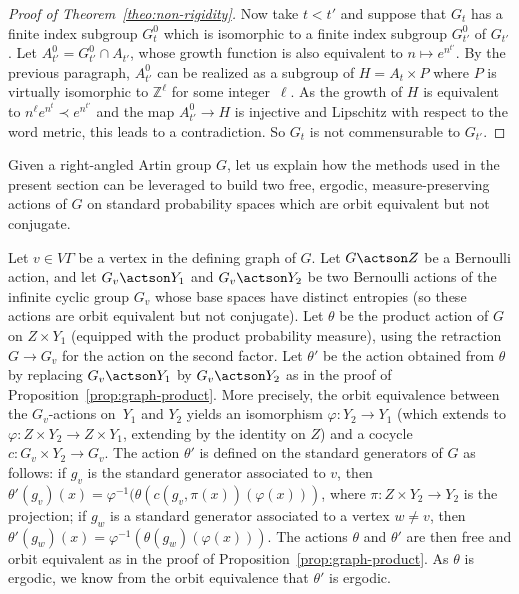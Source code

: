 \begin{proof}[Proof of Theorem~\ref{theo:non-rigidity}]
Now take $t<t'$ and suppose that $G_{t}$ has a finite index subgroup $G^0_t$ which is isomorphic to a finite index subgroup $G^0_{t'}$ of $G_{t'}$. Let $A^0_{t'}=G^0_{t'}\cap A_{t'}$, whose growth function is also equivalent to $n\mapsto e^{n^{t'}}$. By the previous paragraph, $A^0_{t'}$ can be realized as a subgroup of $H=A_t\times P$ where $P$ is virtually isomorphic to $\mathbb Z^\ell$ for some integer~$\ell$. As the growth of $H$ is equivalent to $n^\ell e^{n^{t}}\prec e^{n^{t'}}$ and the map $A^0_{t'}\to H$ is injective and Lipschitz with respect to the word metric, this leads to a contradiction. So $G_t$ is not commensurable to $G_{t'}$.
\end{proof}

\begin{rk}\label{rk:oe-non-conj}
Given a right-angled Artin group $G$, let us explain how the methods used in the present section can be leveraged to build two free, ergodic, measure-preserving actions of $G$ on standard probability spaces which are orbit equivalent but not conjugate.

Let $v\in V\Gamma$ be a vertex in the defining graph of $G$. Let $G\actson Z$ be a Bernoulli action, and let $G_v\actson Y_1$ and $G_v\actson Y_2$ be two Bernoulli actions of the infinite cyclic group $G_v$ whose base spaces have distinct entropies (so these actions are orbit equivalent but not conjugate). Let $\theta$ be the product action of $G$ on $Z\times Y_1$ (equipped with the product probability measure), using the retraction $G\to G_v$ for the action on the second factor. Let $\theta'$ be the action obtained from $\theta$ by replacing $G_v\actson Y_1$ by $G_v\actson Y_2$ as in the proof of Proposition~\ref{prop:graph-product}. More precisely, the orbit equivalence between the $G_v$-actions on~$Y_1$ and $Y_2$ yields an isomorphism $\varphi:Y_2\to Y_1$ (which extends to $\varphi:Z\times Y_2\to Z\times Y_1$, extending by the identity on $Z$) and a cocycle $c:G_v\times Y_2\to G_v$. The action $\theta'$ is defined on the standard generators of $G$ as follows: if $g_v$ is the standard generator associated to $v$, then $\theta'(g_v)(x)=\varphi^{-1}(\theta(c(g_v,\pi(x))(\varphi(x)))$, where $\pi:Z\times Y_2\to Y_2$ is the projection; if $g_w$ is a standard generator associated to a vertex $w\neq v$, then $\theta'(g_w)(x)=\varphi^{-1}(\theta(g_w)(\varphi(x)))$. The actions $\theta$ and $\theta'$ are then free and orbit equivalent as in the proof of Proposition~\ref{prop:graph-product}. As $\theta$ is ergodic, we know from the orbit equivalence that $\theta'$ is ergodic.


\end{rk}
